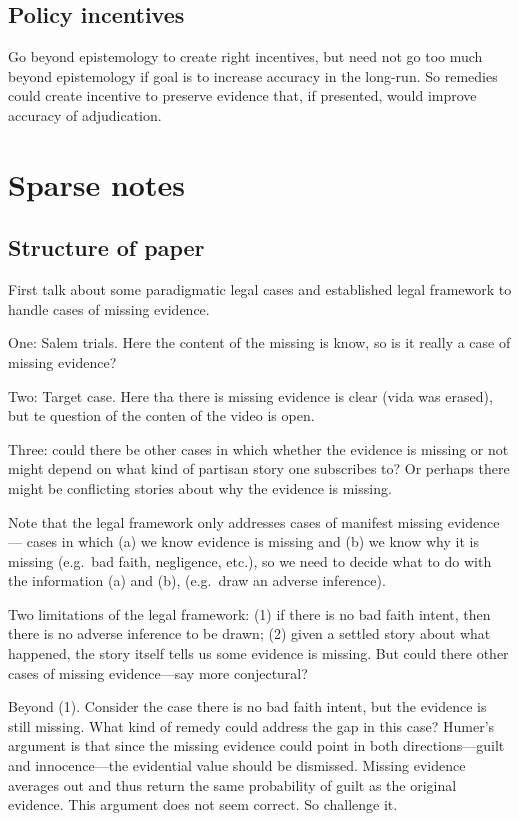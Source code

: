\documentclass[
  10pt,
  dvipsnames,enabledeprecatedfontcommands]{scrartcl}
\begin{document}
\hypertarget{policy-incentives}{%
\subsection{Policy incentives}\label{policy-incentives}}

Go beyond epistemology to create right incentives, but need not go too
much beyond epistemology if goal is to increase accuracy in the
long-run. So remedies could create incentive to preserve evidence that,
if presented, would improve accuracy of adjudication.

\hypertarget{sparse-notes}{%
\section{Sparse notes}\label{sparse-notes}}

\hypertarget{structure-of-paper}{%
\subsection{Structure of paper}\label{structure-of-paper}}

First talk about some paradigmatic legal cases and established legal
framework to handle cases of missing evidence.

One: Salem trials. Here the content of the missing is know, so is it
really a case of missing evidence?

Two: Target case. Here tha there is missing evidence is clear (vida was
erased), but te question of the conten of the video is open.

Three: could there be other cases in which whether the evidence is
missing or not might depend on what kind of partisan story one
subscribes to? Or perhaps there might be conflicting stories about why
the evidence is missing.

Note that the legal framework only addresses cases of manifest missing
evidence --- cases in which (a) we know evidence is missing and (b) we
know why it is missing (e.g.~bad faith, negligence, etc.), so we need to
decide what to do with the information (a) and (b), (e.g.~draw an
adverse inference).

Two limitations of the legal framework: (1) if there is no bad faith
intent, then there is no adverse inference to be drawn; (2) given a
settled story about what happened, the story itself tells us some
evidence is missing. But could there other cases of missing
evidence---say more conjectural?

Beyond (1). Consider the case there is no bad faith intent, but the
evidence is still missing. What kind of remedy could address the gap in
this case? Humer's argument is that since the missing evidence could
point in both directions---guilt and innocence---the evidential value
should be dismissed. Missing evidence averages out and thus return the
same probability of guilt as the original evidence. This argument does
not seem correct. So challenge it.
\end{document}
